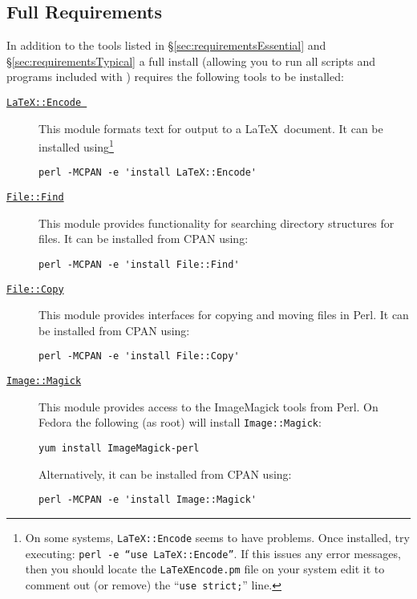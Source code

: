 \subsection{Full Requirements}\label{sec:requirementsFull}

In addition to the tools listed in \S\ref{sec:requirementsEssential} and \S\ref{sec:requirementsTypical} a full install (allowing you to run all scripts and programs included with \glc) requires the following tools to be installed:

\begin{description}
\item [\href{http://search.cpan.org/~andrewf/LaTeX-Encode-0.03/lib/LaTeX/Encode.pm}{{\tt LaTeX::Encode }}] This module formats text for output to a \LaTeX\ document. It can be installed using\footnote{On some systems, {\tt LaTeX::Encode} seems to have problems. Once installed, try executing: {\tt perl -e ``use LaTeX::Encode''}. If this issues any error messages, then you should locate the {\tt LaTeX\/Encode.pm} file on your system edit it to comment out (or remove) the ``{\tt use strict;}'' line.}
\begin{verbatim}
perl -MCPAN -e 'install LaTeX::Encode'
\end{verbatim}
  \item [\href{http://search.cpan.org/~jesse/perl-5.12.1/lib/File/Find.pm}{{\tt File::Find}}] This module provides functionality for searching directory structures for files. It can be installed from CPAN using:
\begin{verbatim}
perl -MCPAN -e 'install File::Find'
\end{verbatim}
  \item [\href{http://search.cpan.org/~jesse/perl-5.12.1/lib/File/Copy.pm}{{\tt File::Copy}}] This module provides interfaces for copying and moving files in Perl. It can be installed from CPAN using:
\begin{verbatim}
perl -MCPAN -e 'install File::Copy'
\end{verbatim}
  \item [\href{http://search.cpan.org/~jcristy/PerlMagick-6.59/Magick.pm}{{\tt Image::Magick}}] This module provides access to the {\sc ImageMagick} tools from Perl. On Fedora the following (as root) will install {\tt Image::Magick}:
\begin{verbatim}
yum install ImageMagick-perl
\end{verbatim}
Alternatively, it can be installed from CPAN using:
\begin{verbatim}
perl -MCPAN -e 'install Image::Magick'
\end{verbatim}


\end{description}

